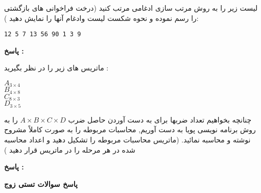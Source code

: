 \documentclass[11pt,a4paper]{exam}
\theoremstyle{definition}
\newcommand{\showallanswers}{\par\unvbox\allanswers}
\begin{document}
\begin{questions}
\question
\vspace*{1in}

\question
لیست زیر را به روش مرتب سازی ادغامی مرتب کنید (درخت فراخوانی های بازگشتی را رسم نموده و نحوه شکست لیست وادغام آنها را نمایش دهید ):
\begin{latin}
\begin{lstlisting}
12 5 7 13 56 90 1 3 9
\end{lstlisting}
\end{latin}
\begin{flushright}
\textbf{پاسخ :}
\end{flushright}

\begin{latin}
\begin{center}



\end{center}
\end{latin}

\vspace{0.5in}

\question
\vspace*{1in}



\question
ماتریس های زیر را در نظر بگیرید :
\begin{latin}
$A_{3\times4}$\\
$B_{4\times8}$\\
$C_{8\times3}$\\
$D_{3\times5}$
\end{latin}
چنانچه بخواهیم تعداد ضربها برای به دست آوردن حاصل ضرب {$A\times B \times C \times D$} را به روش برنامه نویسی پویا به دست آوریم, محاسبات مربوطه را به صورت کاملاً مشروح نوشته و محاسبه نمائید. (ماتریس محاسبات مربوطه را تشکیل دهید و اعداد محاسبه شده در هر مرحله را در ماتریس قرار دهید )

\begin{flushright}
\textbf{پاسخ :}
\end{flushright}

\vspace{0.5in}

\question
{}
\newpage

\end{questions}


\bigskip
\begin{center}
\textbf{ پاسخ سوالات تستی زوج }
\end{center}
\bigskip  

\showallanswers %
\end{document}
